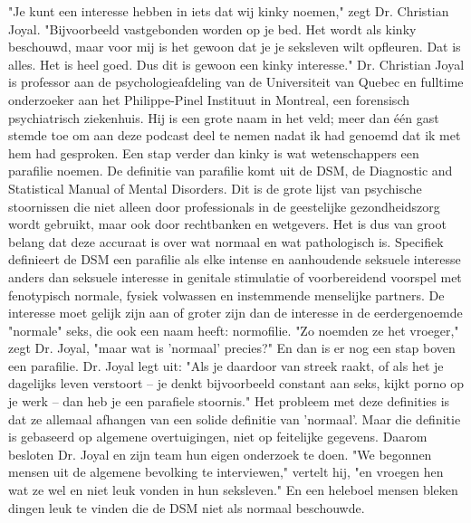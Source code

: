 "Je kunt een interesse hebben in iets dat wij kinky noemen," zegt Dr. Christian Joyal. "Bijvoorbeeld vastgebonden worden op je bed. Het wordt als kinky beschouwd, maar voor mij is het gewoon dat je je seksleven wilt opfleuren. Dat is alles. Het is heel goed. Dus dit is gewoon een kinky interesse."
Dr. Christian Joyal is professor aan de psychologieafdeling van de Universiteit van Quebec en fulltime onderzoeker aan het Philippe-Pinel Instituut in Montreal, een forensisch psychiatrisch ziekenhuis. Hij is een grote naam in het veld; meer dan één gast stemde toe om aan deze podcast deel te nemen nadat ik had genoemd dat ik met hem had gesproken.
Een stap verder dan kinky is wat wetenschappers een parafilie noemen. De definitie van parafilie komt uit de DSM, de Diagnostic and Statistical Manual of Mental Disorders. Dit is de grote lijst van psychische stoornissen die niet alleen door professionals in de geestelijke gezondheidszorg wordt gebruikt, maar ook door rechtbanken en wetgevers. Het is dus van groot belang dat deze accuraat is over wat normaal en wat pathologisch is. Specifiek definieert de DSM een parafilie als elke intense en aanhoudende seksuele interesse anders dan seksuele interesse in genitale stimulatie of voorbereidend voorspel met fenotypisch normale, fysiek volwassen en instemmende menselijke partners. De interesse moet gelijk zijn aan of groter zijn dan de interesse in de eerdergenoemde "normale" seks, die ook een naam heeft: normofilie. "Zo noemden ze het vroeger," zegt Dr. Joyal, "maar wat is 'normaal' precies?"
En dan is er nog een stap boven een parafilie. Dr. Joyal legt uit: "Als je daardoor van streek raakt, of als het je dagelijks leven verstoort – je denkt bijvoorbeeld constant aan seks, kijkt porno op je werk – dan heb je een parafiele stoornis."
Het probleem met deze definities is dat ze allemaal afhangen van een solide definitie van 'normaal'. Maar die definitie is gebaseerd op algemene overtuigingen, niet op feitelijke gegevens. Daarom besloten Dr. Joyal en zijn team hun eigen onderzoek te doen. "We begonnen mensen uit de algemene bevolking te interviewen," vertelt hij, "en vroegen hen wat ze wel en niet leuk vonden in hun seksleven." En een heleboel mensen bleken dingen leuk te vinden die de DSM niet als normaal beschouwde.
